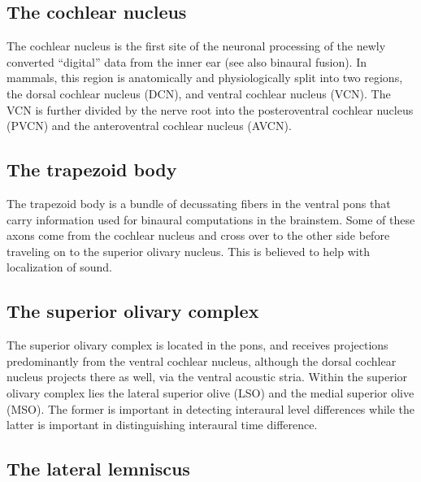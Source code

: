 \hypertarget{the-cochlear-nucleus}{%
\subsection{The cochlear nucleus}\label{the-cochlear-nucleus}}

The cochlear nucleus is the first site of the neuronal processing of the newly converted ``digital'' data from the inner ear (see also binaural fusion). In mammals, this region is anatomically and physiologically split into two regions, the dorsal cochlear nucleus (DCN), and ventral cochlear nucleus (VCN). The VCN is further divided by the nerve root into the posteroventral cochlear nucleus (PVCN) and the anteroventral cochlear nucleus (AVCN).

\hypertarget{the-trapezoid-body}{%
\subsection{The trapezoid body}\label{the-trapezoid-body}}

The trapezoid body is a bundle of decussating fibers in the ventral pons that carry information used for binaural computations in the brainstem. Some of these axons come from the cochlear nucleus and cross over to the other side before traveling on to the superior olivary nucleus. This is believed to help with localization of sound.

\hypertarget{the-superior-olivary-complex}{%
\subsection{The superior olivary complex}\label{the-superior-olivary-complex}}

The superior olivary complex is located in the pons, and receives projections predominantly from the ventral cochlear nucleus, although the dorsal cochlear nucleus projects there as well, via the ventral acoustic stria. Within the superior olivary complex lies the lateral superior olive (LSO) and the medial superior olive (MSO). The former is important in detecting interaural level differences while the latter is important in distinguishing interaural time difference.

\hypertarget{the-lateral-lemniscus}{%
\subsection{The lateral lemniscus}\label{the-lateral-lemniscus}}


